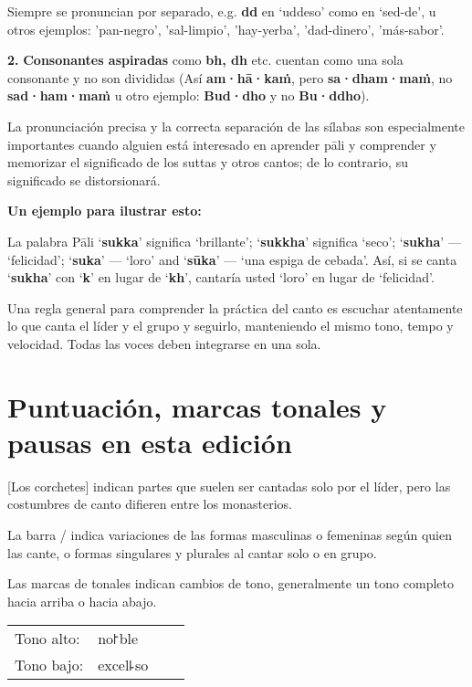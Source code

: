 Siempre se pronuncian por separado, e.g. \textbf{dd} en ‘uddeso’ como en
 ‘sed-de’, u otros ejemplos: 'pan-negro', 'sal-limpio', 'hay-yerba', 'dad-dinero', 'más-sabor'.

\textbf{2.} \textbf{Consonantes aspiradas} como \textbf{bh, dh} etc.
cuentan como una sola consonante y no son divididas (Así
\textbf{am·hā·kaṁ}, pero \textbf{sa·dham·maṁ}, no \textbf{sad·ham·maṁ}
u otro ejemplo: \textbf{Bud·dho} y no \textbf{Bu·ddho}).

La pronunciación precisa y la correcta separación de las sílabas son especialmente importantes cuando alguien está interesado en aprender pāli y comprender y memorizar el significado de los suttas y otros cantos; de lo contrario, su significado se distorsionará.


\textbf{Un ejemplo para ilustrar esto:}

La palabra Pāli ‘\textbf{sukka}’ significa ‘brillante’; ‘\textbf{sukkha}’ significa
‘seco’; ‘\textbf{sukha}’ --- ‘felicidad’; ‘\textbf{suka}’ --- ‘loro’ and
‘\textbf{sūka}’ --- ‘una espiga de cebada'.
Así, si se canta ‘\textbf{sukha}’ con ‘\textbf{k}’ en lugar de
‘\textbf{kh}’, cantaría usted ‘loro’ en lugar de ‘felicidad’.

Una regla general para comprender la práctica del canto es escuchar atentamente lo que canta el líder y el grupo y seguirlo, manteniendo el mismo tono, tempo y velocidad. Todas las voces deben integrarse en una sola.

\section{Puntuación, marcas tonales y pausas en esta edición}

[Los corchetes] indican partes que suelen ser cantadas solo por el líder, pero las costumbres de canto difieren entre los monasterios.

La barra / indica variaciones de las formas masculinas o femeninas según quien las cante, o formas singulares y plurales al cantar solo o en grupo.

Las marcas de tonales indican cambios de tono, generalmente un tono completo hacia arriba o hacia abajo.

\begin{tabular}{llll}
	Tono alto: & no꜓ble \\
	Tono bajo: & excel꜕so \\
\end{tabular}

%
